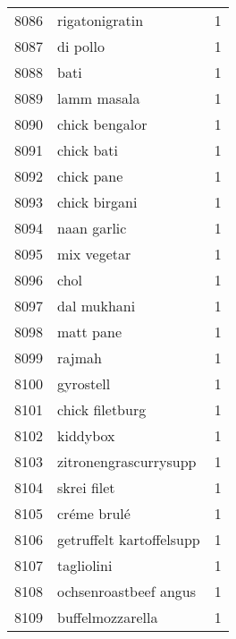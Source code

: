 \begin{tabular}{llr}
8086 &                                     rigatonigratin &      1 \\
8087 &                                           di pollo &      1 \\
8088 &                                               bati &      1 \\
8089 &                                        lamm masala &      1 \\
8090 &                                     chick bengalor &      1 \\
8091 &                                         chick bati &      1 \\
8092 &                                         chick pane &      1 \\
8093 &                                      chick birgani &      1 \\
8094 &                                        naan garlic &      1 \\
8095 &                                        mix vegetar &      1 \\
8096 &                                               chol &      1 \\
8097 &                                        dal mukhani &      1 \\
8098 &                                          matt pane &      1 \\
8099 &                                             rajmah &      1 \\
8100 &                                          gyrostell &      1 \\
8101 &                                    chick filetburg &      1 \\
8102 &                                           kiddybox &      1 \\
8103 &                              zitronengrascurrysupp &      1 \\
8104 &                                        skrei filet &      1 \\
8105 &                                        créme brulé &      1 \\
8106 &                           getruffelt kartoffelsupp &      1 \\
8107 &                                         tagliolini &      1 \\
8108 &                              ochsenroastbeef angus &      1 \\
8109 &                                   buffelmozzarella &      1 \\

\end{tabular}
